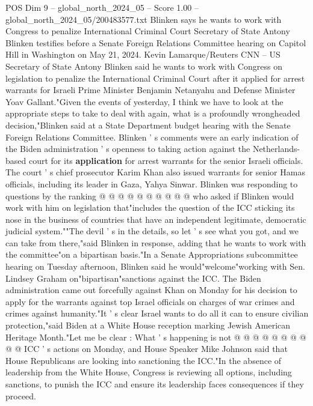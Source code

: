 \begin{textsample}{POS Dim 9 – global\_north\_2024\_05 – Score 1.00 – global\_north\_2024\_05/200483577.txt}  \label{ex:f9_pos_212}
Blinken says he wants to work with Congress to penalize International Criminal Court Secretary of State Antony Blinken testifies before a Senate Foreign Relations Committee hearing on Capitol Hill in Washington on May 21, 2024.
Kevin Lamarque/Reuters CNN -- US Secretary of State Antony Blinken said he wants to work with Congress on legislation to penalize the International Criminal Court after it applied for arrest warrants for Israeli Prime Minister Benjamin Netanyahu and Defense Minister Yoav Gallant."Given the events of yesterday, I think we have to look at the appropriate steps to take to deal with again, what is a profoundly wrongheaded decision,"Blinken said at a State Department budget hearing with the Senate Foreign Relations Committee.
Blinken ' s comments were an early indication of the Biden administration ' s openness to taking action against the Netherlands-based court for its \textbf{application} for arrest warrants for the senior Israeli officials.
The court ' s chief prosecutor Karim Khan also issued warrants for senior Hamas officials, including its leader in Gaza, Yahya Sinwar.
Blinken was responding to questions by the ranking @ @ @ @ @ @ @ @ @ @ who asked if Blinken would work with him on legislation that"includes the question of the ICC sticking its nose in the business of countries that have an independent legitimate, democratic judicial system.""The devil ' s in the details, so let ' s see what you got, and we can take from there,"said Blinken in response, adding that he wants to work with the committee"on a bipartisan basis."In a Senate Appropriations subcommittee hearing on Tuesday afternoon, Blinken said he would"welcome"working with Sen.
Lindsey Graham on"bipartisan"sanctions against the ICC.
The Biden administration came out forcefully against Khan on Monday for his decision to apply for the warrants against top Israel officials on charges of war crimes and crimes against humanity."It ' s clear Israel wants to do all it can to ensure civilian protection,"said Biden at a White House reception marking Jewish American Heritage Month."Let me be clear : What ' s happening is not @ @ @ @ @ @ @ @ @ @ ICC ' s actions on Monday, and House Speaker Mike Johnson said that House Republicans are looking into sanctioning the ICC."In the absence of leadership from the White House, Congress is reviewing all options, including sanctions, to punish the ICC and ensure its leadership faces consequences if they proceed.

\end{textsample}
